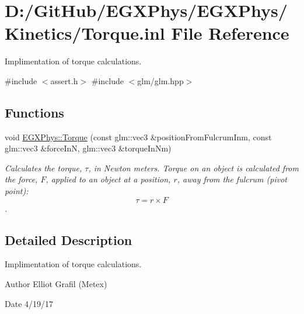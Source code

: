 \hypertarget{_torque_8inl}{}\section{D\+:/\+Git\+Hub/\+E\+G\+X\+Phys/\+E\+G\+X\+Phys/\+Kinetics/\+Torque.inl File Reference}
\label{_torque_8inl}


Implimentation of torque calculations.  


{\ttfamily \#include $<$assert.\+h$>$}\newline
{\ttfamily \#include $<$glm/glm.\+hpp$>$}\newline
\subsection*{Functions}
\begin{DoxyCompactItemize}
\item 
void \mbox{\hyperlink{group___e_g_x_phys-_kinetics-_torque_ga12a787853cab88d40412c8290ca41c61}{E\+G\+X\+Phys\+::\+Torque}} (const glm\+::vec3 \&position\+From\+Fulcrum\+Inm, const glm\+::vec3 \&force\+InN, glm\+::vec3 \&torque\+In\+Nm)
\begin{DoxyCompactList}\small\item\em Calculates the torque, $\tau$, in Newton meters. Torque on an object is calculated from the force, $F$, applied to an object at a position, $r$, away from the fulcrum (pivot point)\+: \[\tau=r \times F \]. \end{DoxyCompactList}\end{DoxyCompactItemize}


\subsection{Detailed Description}
Implimentation of torque calculations. 

\begin{DoxyAuthor}{Author}
Elliot Grafil (Metex) 
\end{DoxyAuthor}
\begin{DoxyDate}{Date}
4/19/17 
\end{DoxyDate}
